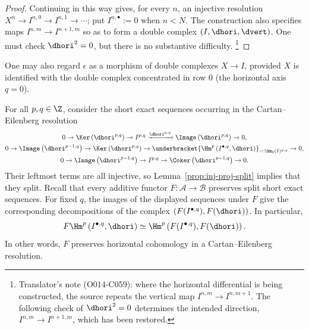 \begin{proof}
	Continuing in this way gives, for every $n$, an injective resolution
	$X^n\to I^{n,0}\to I^{n,1}\to\cdots$; put $I^{n,\bullet}:=0$ when $n<N$.
	The construction also specifies maps $I^{n,m}\to I^{n+1,m}$ so as to form
	a double complex $(I,\dhori,\dvert)$. One must check $\dhori^2=0$, but
	there is no substantive difficulty.
	\footnote{Translator's note (O014-C059): where the horizontal differential
	is being constructed, the source repeats the vertical map
	$I^{n,m}\to I^{n,m+1}$. The following check of $\dhori^2=0$ determines the
	intended direction, $I^{n,m}\to I^{n+1,m}$, which has been restored.}
\end{proof}

One may also regard $\epsilon$ as a morphism of double complexes $X\to I$,
provided $X$ is identified with the double complex concentrated in row $0$
(the horizontal axis $q=0$).

\begin{remark}\label{rem:CE-split}
	For all $p,q\in\Z$, consider the short exact sequences occurring in the
	Cartan--Eilenberg resolution
	\begin{gather*}
		0 \to \Ker\left( \dhori^{p,q} \right) \to I^{p,q} \xrightarrow{\dhori^{p,q}} \Image\left( \dhori^{p,q} \right) \to 0, \\
		0 \to \Image\left( \dhori^{p-1,q} \right) \to \Ker\left( \dhori^{p,q} \right) \to \underbracket{\Hm^p\left( I^{\bullet, q}, \dhori \right)}_{=: \Hm_{\mathrm{I}}(I)^{p,q}} \to 0, \\
		0 \to \Image\left( \dhori^{p-1,q} \right) \to I^{p, q} \to \Coker\left( \dhori^{p-1,q} \right) \to 0.
	\end{gather*}
	Their leftmost terms are all injective, so
	Lemma~\ref{prop:inj-proj-split} implies that they split. Recall that every
	additive functor $F:\mathcal{A}\to\mathcal{B}$ preserves split short exact
	sequences. For fixed $q$, the images of the displayed sequences under $F$
	give the corresponding decompositions of the complex
	$(F(I^{\bullet,q}),F(\dhori))$. In particular,
	\[ F\Hm^p\left( I^{\bullet, q}, \dhori \right) \simeq \Hm^p\left( F(I^{\bullet, q}), F(\dhori) \right). \]
	In other words, $F$ preserves horizontal cohomology in a
	Cartan--Eilenberg resolution.
\end{remark}


